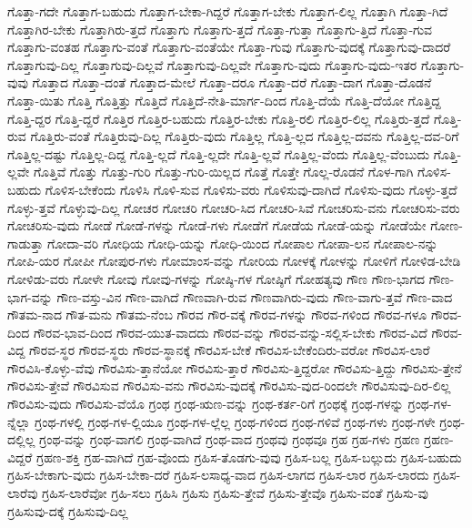 {ಗೊತ್ತಾ-ಗದೇ
ಗೊತ್ತಾಗ-ಬಹುದು
ಗೊತ್ತಾಗ-ಬೇಕಾ-ಗಿದ್ದರೆ
ಗೊತ್ತಾಗ-ಬೇಕು
ಗೊತ್ತಾಗ-ಲಿಲ್ಲ
ಗೊತ್ತಾಗಿ
ಗೊತ್ತಾ-ಗಿದೆ
ಗೊತ್ತಾಗಿರ-ಬೇಕು
ಗೊತ್ತಾಗಿರು-ತ್ತದೆ
ಗೊತ್ತಾಗು
ಗೊತ್ತಾಗು-ತ್ತದೆ
ಗೊತ್ತಾ-ಗುತ್ತಾ
ಗೊತ್ತಾಗು-ತ್ತಿದೆ
ಗೊತ್ತಾ-ಗುವ
ಗೊತ್ತಾಗು-ವಂತಹ
ಗೊತ್ತಾಗು-ವಂತೆ
ಗೊತ್ತಾಗು-ವಂತೆಯೇ
ಗೊತ್ತಾ-ಗುವು
ಗೊತ್ತಾಗು-ವುದಕ್ಕೆ
ಗೊತ್ತಾಗುವು-ದಾದರೆ
ಗೊತ್ತಾಗುವು-ದಿಲ್ಲ
ಗೊತ್ತಾಗುವು-ದಿಲ್ಲವೆ
ಗೊತ್ತಾಗುವು-ದಿಲ್ಲವೇ
ಗೊತ್ತಾಗು-ವುದು
ಗೊತ್ತಾಗು-ವುದು-ಇತರ
ಗೊತ್ತಾಗು-ವುವು
ಗೊತ್ತಾದ
ಗೊತ್ತಾ-ದಂತೆ
ಗೊತ್ತಾದ-ಮೇಲೆ
ಗೊತ್ತಾ-ದರೂ
ಗೊತ್ತಾ-ದರೆ
ಗೊತ್ತಾ-ದಾಗ
ಗೊತ್ತಾ-ದೊಡನೆ
ಗೊತ್ತಾ-ಯಿತು
ಗೊತ್ತಿ
ಗೊತ್ತಿತ್ತು
ಗೊತ್ತಿದೆ
ಗೊತ್ತಿದೆ-ನೇತಿ-ಮಾರ್ಗ-ದಿಂದ
ಗೊತ್ತಿ-ದೆಯೆ
ಗೊತ್ತಿ-ದೆಯೋ
ಗೊತ್ತಿದ್ದ
ಗೊತ್ತಿ-ದ್ದರ
ಗೊತ್ತಿ-ದ್ದರೆ
ಗೊತ್ತಿರ
ಗೊತ್ತಿರ-ಬಹುದು
ಗೊತ್ತಿರ-ಬೇಕು
ಗೊತ್ತಿ-ರಲಿ
ಗೊತ್ತಿರ-ಲಿಲ್ಲ
ಗೊತ್ತಿರು-ತ್ತದೆ
ಗೊತ್ತಿ-ರುವ
ಗೊತ್ತಿರು-ವಂತೆ
ಗೊತ್ತಿರುವು-ದಿಲ್ಲ
ಗೊತ್ತಿರು-ವುದು
ಗೊತ್ತಿಲ್ಲ
ಗೊತ್ತಿ-ಲ್ಲದ
ಗೊತ್ತಿಲ್ಲ-ದವನು
ಗೊತ್ತಿಲ್ಲ-ದವ-ರಿಗೆ
ಗೊತ್ತಿಲ್ಲ-ದಷ್ಟು
ಗೊತ್ತಿಲ್ಲ-ದಿದ್ದ
ಗೊತ್ತಿ-ಲ್ಲದೆ
ಗೊತ್ತಿ-ಲ್ಲದೇ
ಗೊತ್ತಿ-ಲ್ಲವೆ
ಗೊತ್ತಿಲ್ಲ-ವೆಂದು
ಗೊತ್ತಿಲ್ಲ-ವೆಂಬುದು
ಗೊತ್ತಿ-ಲ್ಲವೇ
ಗೊತ್ತಿವೆ
ಗೊತ್ತು
ಗೊತ್ತು-ಗುರಿ
ಗೊತ್ತು-ಗುರಿ-ಯಿಲ್ಲದ
ಗೊತ್ತೆ
ಗೊತ್ತೇ
ಗೊಲ್ಲ-ರೊಡನೆ
ಗೊಳ-ಗಾಗಿ
ಗೊಳಿಸ-ಬಹುದು
ಗೊಳಿಸ-ಬೇಕೆಂದು
ಗೊಳಿಸಿ
ಗೊಳಿ-ಸುವ
ಗೊಳಿಸು-ವರು
ಗೊಳಿಸುವು-ದಾಗಿದೆ
ಗೊಳಿಸು-ವುದು
ಗೊಳ್ಳು-ತ್ತದೆ
ಗೊಳ್ಳು-ತ್ತವೆ
ಗೊಳ್ಳುವು-ದಿಲ್ಲ
ಗೋಚರ
ಗೋಚರಿ
ಗೋಚರಿ-ಸಿದ
ಗೋಚರಿ-ಸಿವೆ
ಗೋಚರಿಸು-ವನು
ಗೋಚರಿಸು-ವರು
ಗೋಚರಿಸು-ವುದು
ಗೋಡೆ
ಗೋಡೆ-ಗಳನ್ನು
ಗೋಡೆ-ಗಳು
ಗೋಡೆಗೆ
ಗೋಡೆಯ
ಗೋಡೆ-ಯನ್ನು
ಗೋಡೆಯೇ
ಗೋಣ-ಗಾಡುತ್ತಾ
ಗೋದಾ-ವರಿ
ಗೋಧಿಯ
ಗೋಧಿ-ಯನ್ನು
ಗೋಧಿ-ಯಿಂದ
ಗೋಪಾಲ
ಗೋಪಾ-ಲನ
ಗೋಪಾಲ-ನನ್ನು
ಗೋಪಿ-ಯರ
ಗೋಪೀ
ಗೋಪುರ-ಗಳು
ಗೋಮಾಂಸ-ವನ್ನು
ಗೋರಿಯ
ಗೋಳಕ್ಕೆ
ಗೋಳನ್ನು
ಗೋಳಿಗೆ
ಗೋಳಿಡ-ಬೇಡಿ
ಗೋಳಿಡು-ವರು
ಗೋಳೇ
ಗೋವು
ಗೋವು-ಗಳನ್ನು
ಗೋಷ್ಠಿ-ಗಳ
ಗೋಷ್ಠಿಗೆ
ಗೋಹತ್ಯವು
ಗೌಣ
ಗೌಣ-ಭಾಗದ
ಗೌಣ-ಭಾಗ-ವನ್ನು
ಗೌಣ-ವಸ್ತು-ವಿನ
ಗೌಣ-ವಾಗಿದೆ
ಗೌಣವಾಗಿ-ರುವ
ಗೌಣವಾಗಿರು-ವುದು
ಗೌಣ-ವಾಗು-ತ್ತವೆ
ಗೌಣ-ವಾದ
ಗೌತಮ-ನಾದ
ಗೌತ-ಮನು
ಗೌತಮ-ನೆಂಬ
ಗೌರವ
ಗೌರ-ವಕ್ಕೆ
ಗೌರವ-ಗಳನ್ನು
ಗೌರವ-ಗಳಿಂದ
ಗೌರವ-ಗಳೂ
ಗೌರವ-ದಿಂದ
ಗೌರವ-ಭಾವ-ದಿಂದ
ಗೌರವ-ಯುತ-ವಾದದು
ಗೌರವ-ವನ್ನು
ಗೌರವ-ವನ್ನು-ಸಲ್ಲಿಸ-ಬೇಕು
ಗೌರವ-ವಿದೆ
ಗೌರವ-ವಿದ್ದ
ಗೌರವ-ಸ್ಥರ
ಗೌರವ-ಸ್ಥರು
ಗೌರವ-ಸ್ಥಾನಕ್ಕೆ
ಗೌರವಿಸ-ಬೇಕೆ
ಗೌರವಿಸ-ಬೇಕೆಂದಿರು-ವರೋ
ಗೌರವಿಸ-ಲಾರೆ
ಗೌರವಿಸಿ-ಕೊಳ್ಳು-ವೆವು
ಗೌರವಿಸು-ತ್ತಾನೆಯೋ
ಗೌರವಿಸು-ತ್ತಾರೆ
ಗೌರವಿಸು-ತ್ತಿದ್ದರೋ
ಗೌರವಿಸು-ತ್ತಿದ್ದು
ಗೌರವಿಸು-ತ್ತೇನೆ
ಗೌರವಿಸು-ತ್ತೇವೆ
ಗೌರವಿಸುವ
ಗೌರವಿಸು-ವನು
ಗೌರವಿಸು-ವುದಕ್ಕೆ
ಗೌರವಿಸು-ವುದ-ರಿಂದಲೇ
ಗೌರವಿಸುವು-ದಿರ-ಲಿಲ್ಲ
ಗೌರವಿಸು-ವುದು
ಗೌರವಿಸು-ವೆಯೊ
ಗ್ರಂಥ
ಗ್ರಂಥ-ಋಣ-ವನ್ನು
ಗ್ರಂಥ-ಕರ್ತ-ರಿಗೆ
ಗ್ರಂಥಕ್ಕೆ
ಗ್ರಂಥ-ಗಳನ್ನು
ಗ್ರಂಥ-ಗಳ-ನ್ನೆಲ್ಲಾ
ಗ್ರಂಥ-ಗಳಲ್ಲಿ
ಗ್ರಂಥ-ಗಳ-ಲ್ಲಿಯೂ
ಗ್ರಂಥ-ಗಳ-ಲ್ಲೆಲ್ಲ
ಗ್ರಂಥ-ಗಳಿಂದ
ಗ್ರಂಥ-ಗಳಿವೆ
ಗ್ರಂಥ-ಗಳು
ಗ್ರಂಥ-ಗಳೇ
ಗ್ರಂಥ-ದಲ್ಲಿಲ್ಲ
ಗ್ರಂಥ-ವನ್ನು
ಗ್ರಂಥ-ವಾಗಲಿ
ಗ್ರಂಥ-ವಾಗಿದೆ
ಗ್ರಂಥ-ವಾದ
ಗ್ರಂಥವು
ಗ್ರಂಥವೂ
ಗ್ರಹ
ಗ್ರಹ-ಗಳು
ಗ್ರಹಣ
ಗ್ರಹಣ-ವಿದ್ದರೆ
ಗ್ರಹಣ-ಶಕ್ತಿ
ಗ್ರಹ-ವಾಗಿದೆ
ಗ್ರಹ-ವೊಂದು
ಗ್ರಹಿಸ-ತೊಡಗು-ವುವು
ಗ್ರಹಿಸ-ಬಲ್ಲ
ಗ್ರಹಿಸ-ಬಲ್ಲುದು
ಗ್ರಹಿಸ-ಬಹುದು
ಗ್ರಹಿಸ-ಬೇಕಾಗು-ವುದು
ಗ್ರಹಿಸ-ಬೇಕಾ-ದರೆ
ಗ್ರಹಿಸ-ಲಸಾಧ್ಯ-ವಾದ
ಗ್ರಹಿಸ-ಲಾಗದ
ಗ್ರಹಿಸ-ಲಾರ
ಗ್ರಹಿಸ-ಲಾರದು
ಗ್ರಹಿಸ-ಲಾರೆವು
ಗ್ರಹಿಸ-ಲಾರೆವೋ
ಗ್ರಹಿ-ಸಲು
ಗ್ರಹಿಸಿ
ಗ್ರಹಿಸು
ಗ್ರಹಿಸು-ತ್ತೇವೆ
ಗ್ರಹಿಸು-ತ್ತೇವೊ
ಗ್ರಹಿಸು-ವಂತೆ
ಗ್ರಹಿಸು-ವು
ಗ್ರಹಿಸುವು-ದಕ್ಕೆ
ಗ್ರಹಿಸುವು-ದಿಲ್ಲ
}
